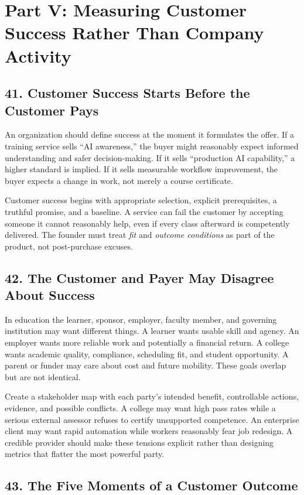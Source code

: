 \section*{Part V: Measuring Customer Success Rather Than Company Activity}

\subsection*{41. Customer Success Starts Before the Customer Pays}

An organization should define success at the moment it formulates the offer. If a training service sells ``AI awareness,'' the buyer might reasonably expect informed understanding and safer decision-making. If it sells ``production AI capability,'' a higher standard is implied. If it sells measurable workflow improvement, the buyer expects a change in work, not merely a course certificate.

Customer success begins with appropriate selection, explicit prerequisites, a truthful promise, and a baseline. A service can fail the customer by accepting someone it cannot reasonably help, even if every class afterward is competently delivered. The founder must treat \emph{fit} and \emph{outcome conditions} as part of the product, not post-purchase excuses.

\subsection*{42. The Customer and Payer May Disagree About Success}

In education the learner, sponsor, employer, faculty member, and governing institution may want different things. A learner wants usable skill and agency. An employer wants more reliable work and potentially a financial return. A college wants academic quality, compliance, scheduling fit, and student opportunity. A parent or funder may care about cost and future mobility. These goals overlap but are not identical.

Create a stakeholder map with each party's intended benefit, controllable actions, evidence, and possible conflicts. A college may want high pass rates while a serious external assessor refuses to certify unsupported competence. An enterprise client may want rapid automation while workers reasonably fear job redesign. A credible provider should make these tensions explicit rather than designing metrics that flatter the most powerful party.

\subsection*{43. The Five Moments of a Customer Outcome}

